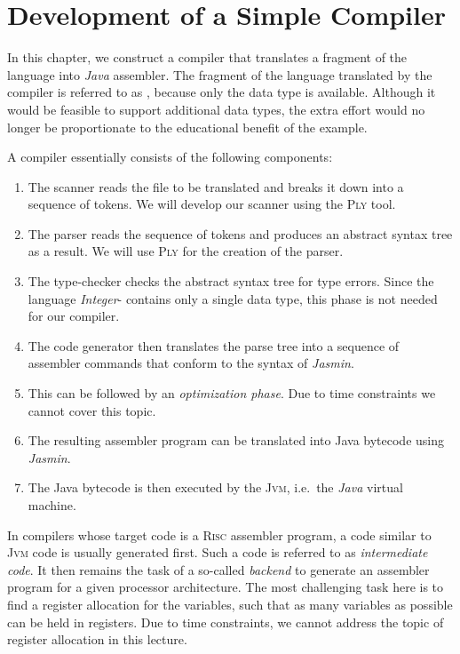 \chapter{Development of a Simple Compiler}
In this chapter, we construct a compiler that translates a fragment of the  language into \textsl{Java}
assembler. The fragment of the  language translated by the compiler is referred to as
,  because only the data type  is
available. Although it would be feasible to support additional data types, the extra effort would no longer be
proportionate to the educational benefit of the example. 

A compiler essentially consists of the following components:
\begin{enumerate}
\item The scanner reads the file to be translated and breaks it down into a sequence of tokens. We will develop
      our scanner using the \textsc{Ply} tool. 
\item The parser reads the sequence of tokens and produces an abstract syntax tree as a result. We will 
      use \textsc{Ply} for the creation of the parser. 
\item The type-checker checks the abstract syntax tree for type errors. Since the language
      \textsl{Integer}- contains only a single data type, this phase is not needed for our compiler. 
\item The code generator then translates the parse tree into a sequence of assembler commands that conform to
      the syntax of \textsl{Jasmin}. 
\item This can be followed by an \emph{optimization phase}.   Due to time constraints we cannot cover this
      topic. 
\item The resulting assembler program can be translated into Java bytecode using \textsl{Jasmin}.
\item The Java bytecode is then executed by the \textsc{Jvm}, i.e.~the \textsl{Java} virtual machine.
\end{enumerate}
In compilers whose target code is a \textsc{Risc} assembler program, a code similar to \textsc{Jvm} code is
usually generated first. Such a code is referred to as \emph{intermediate code}. It then remains the task of a
so-called \emph{backend} to generate an assembler program for a given processor architecture. The most
challenging task here is to find a register allocation for the variables, such that as many variables as
possible can be held in registers. Due to time constraints, we cannot address the topic of register allocation 
in this lecture.

